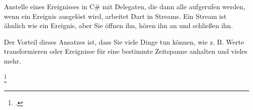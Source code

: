 Anstelle eines Ereignisses in C\# mit Delegaten, die dann alle aufgerufen werden, wenn ein Ereignis ausgelöst wird, arbeitet Dart in Streams. Ein Stream ist ähnlich wie ein Ereignis, aber Sie öffnen ihn, hören ihn an und schließen ihn.

Der Vorteil dieses Ansatzes ist, dass Sie viele Dinge tun können, wie z. B. Werte transformieren oder Ereignisse für eine bestimmte Zeitspanne anhalten und vieles mehr. 

\begin{minipage}{\linewidth}

\end{minipage}
\footcitetext[In Anlehnung an ][Abgerufen am \today]{Pedley2019}


